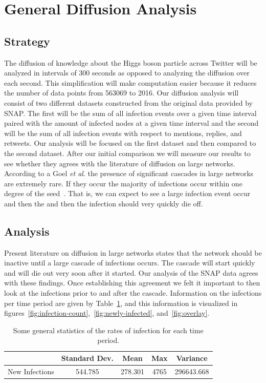 \documentclass[12pt, oneside, openany]{article} %
\begin{document}
\section{General Diffusion Analysis}
\subsection{Strategy}
The diffusion of knowledge about the Higgs boson particle across Twitter will be analyzed in intervals of 300 seconds as opposed to analyzing the diffusion over each second. This simplification will make computation easier because it reduces the number of data points from 563069 to 2016. Our diffusion analysis will consist of two different datasets constructed from the original data provided by SNAP. The first will be the sum of all infection events over a given time interval paired with the amount of infected nodes at a given time interval and the second will be the sum of all infection events with respect to mentions, replies, and retweets. Our analysis will be focused on the first dataset and then compared to the second dataset. After our initial comparison we will measure our results to see whether they agrees with the literature of diffusion on large networks. According to a Goel \emph{et al}. the presence of significant cascades in large networks are extremely rare. If they occur the majority of infections occur within one degree of the seed~\cite{goel}. That is, we can expect to see a large infection event occur and then the and then the infection should very quickly die off.

\subsection{Analysis}
Present literature on diffusion in large networks states that the network should be inactive until a large cascade of infections occurs. The cascade will start quickly and will die out very soon after it started. Our analysis of the SNAP data agrees with these findings. Once establishing this agreement we felt it important to then look at the infections prior to and after the cascade. Information on the infections per time period are given by Table~\ref{tbl:stats}, and this information is visualized in figures~\ref{fig:infection-count},~\ref{fig:newly-infected}, and~\ref{fig:overlay}.

\begin{table}
\centering
\begin{tabular}{| c || c | c | c | c |}
	\hline
   		& Standard Dev. & Mean & Max & Variance \\
   	\hline\hline
  	New Infections & 544.785 & 278.301 & 4765 & 296643.668 \\
	\hline
\end{tabular}
  \caption{Some general statistics of the rates of infection for each time period.}
  \label{tbl:stats}
\end{table}
\end{document}
